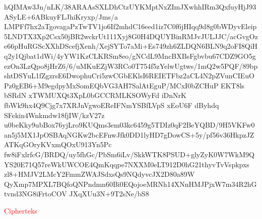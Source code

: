 \documentclass{article}
\begin{document}

hQIMAw3Jn/nLK/38ARAAsSXLDhCtzUYKMptNxZImJXwhhIRm3QxfuyHjJ93ASyLE\ne+6ABkuyFLJhiKryxp/Jms/a LMPFf7hx2aTgovagaPzTwTV1jo6If2mhdC16eed\n1iz7C0f6jHIqq9d8g0bWDyvEleip5LNDTX3Xp2Csx50jBR2wckrUt111Xyj8G0H\n4DQUYBinRMJvJULJJC/acGvgOze66pHuRGScXXhDScefjXenh/XejSYTo7aMi+Es7\nDCCd49zh6ZLDQN6BLN9q2oFI8QiHq2y1Qjbat1dWi/4yYW1KzCLKRSm8eo/gNCdL\nh9MncBXBsFgbvbu67CDZ9GO5gezOn3LzQpo8jHrZ6/6/uMKuEZjW3RCo0T754f\nE5zYelwUgtws/1mQ2w5PQF/89bpshtDSYuL1fZgzrsE6DwophuCri5zwCGbEKlsI\nq6REIETFbz2aCL4N2pZVunCIEuOPz0gEB6+M9egdpyMxSomEQbVG3AH7SalAtEguP\nT/MCxI0bZCHuP EKT8ls bSRdN xTWMUXQt3XpL0bGCCRMLKSOWyFd iDnNrK fbWk\niiqw9hx4Q9Cjg7x7XRJnVgwoEReIFNmYSBfLVpS xEoU6F dByhdq SFekin4Wnkmdw\nqrS18fjIW/kzV27z u0beKky9ubBox76yjLro9KUQms3em03kc6459g5TDIz0qF\nAgwDrosDP2BeYQBD/9H5VKFw0an5j5MX1JpOSBAqNGKw2bcEFnwJfk0DD1lyHD\nowHig7gDowCS+5y/pf56v36HkpzJZATKqGOryKVxmQOxU913Yn5Pc fw8iFxlrfcG\nywzkJh/BRDQ/uy5fhGc/PbSm6iLv/SkkWTK8PSUD+glyZyK0W7WkM9QYS20E71Q\nqbwpNiy57reWkUWCOE4QmKqqpe7NXXM0eLT912D0hG21thyvTvVspkpxs zl8+HMJV\nM2LMcY2FmmZWAJSdxsQs9NQdyvcJX2D80a89W QyXmp7MPXL7BQfoQNPndmn60Bi\n0EQojoeMRNh14XNnHMJPjxW7m34R2hGtvnd3NG8iFrtoCOV JXqXUu3N+9T2sNe/bS8\n\n\begin{center}\large \textcolor{red}{Cipherteks}\end{center}
\end{document}
